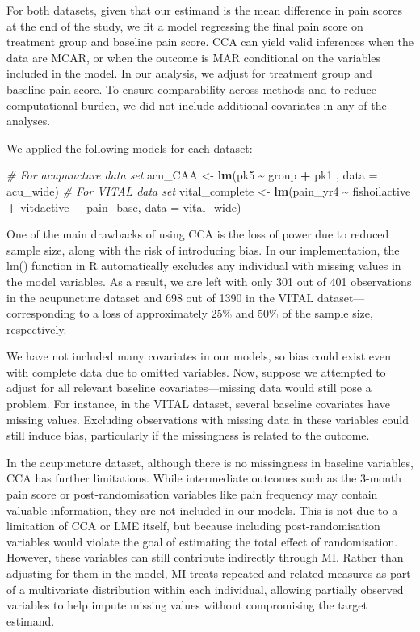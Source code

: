 \documentclass{article}
\newenvironment{Shaded}{\begin{snugshade}}{\end{snugshade}}
\newcommand{\AttributeTok}[1]{\textcolor[rgb]{0.13,0.29,0.53}{#1}}
\newcommand{\CommentTok}[1]{\textcolor[rgb]{0.56,0.35,0.01}{\textit{#1}}}
\newcommand{\FunctionTok}[1]{\textcolor[rgb]{0.13,0.29,0.53}{\textbf{#1}}}
\newcommand{\NormalTok}[1]{#1}
\newcommand{\OtherTok}[1]{\textcolor[rgb]{0.56,0.35,0.01}{#1}}
\newcommand{\SpecialCharTok}[1]{\textcolor[rgb]{0.81,0.36,0.00}{\textbf{#1}}}
\begin{document}
For both datasets, given that our estimand is the mean difference in
pain scores at the end of the study, we fit a model regressing the final
pain score on treatment group and baseline pain score. CCA can yield
valid inferences when the data are MCAR, or when the outcome is MAR
conditional on the variables included in the model. In our analysis, we
adjust for treatment group and baseline pain score. To ensure
comparability across methods and to reduce computational burden, we did
not include additional covariates in any of the analyses.

We applied the following models for each dataset:

\begin{Shaded}
\begin{Highlighting}[]
\CommentTok{\# For acupuncture data set}
\NormalTok{acu\_CAA }\OtherTok{\textless{}{-}} \FunctionTok{lm}\NormalTok{(pk5 }\SpecialCharTok{\textasciitilde{}}\NormalTok{ group }\SpecialCharTok{+}\NormalTok{ pk1 , }\AttributeTok{data =}\NormalTok{ acu\_wide)}
\CommentTok{\# For VITAL data set}
\NormalTok{vital\_complete }\OtherTok{\textless{}{-}} \FunctionTok{lm}\NormalTok{(pain\_yr4 }\SpecialCharTok{\textasciitilde{}}\NormalTok{ fishoilactive }\SpecialCharTok{+}\NormalTok{ vitdactive }\SpecialCharTok{+}\NormalTok{ pain\_base, }\AttributeTok{data =}\NormalTok{ vital\_wide)}
\end{Highlighting}
\end{Shaded}

One of the main drawbacks of using CCA is the loss of power due to
reduced sample size, along with the risk of introducing bias. In our
implementation, the lm() function in R automatically excludes any
individual with missing values in the model variables. As a result, we
are left with only 301 out of 401 observations in the acupuncture
dataset and 698 out of 1390 in the VITAL dataset---corresponding to a
loss of approximately 25\% and 50\% of the sample size, respectively.

We have not included many covariates in our models, so bias could exist
even with complete data due to omitted variables. Now, suppose we
attempted to adjust for all relevant baseline covariates---missing data
would still pose a problem. For instance, in the VITAL dataset, several
baseline covariates have missing values. Excluding observations with
missing data in these variables could still induce bias, particularly if
the missingness is related to the outcome.

In the acupuncture dataset, although there is no missingness in baseline
variables, CCA has further limitations. While intermediate outcomes such
as the 3-month pain score or post-randomisation variables like pain
frequency may contain valuable information, they are not included in our
models. This is not due to a limitation of CCA or LME itself, but
because including post-randomisation variables would violate the goal of
estimating the total effect of randomisation. However, these variables
can still contribute indirectly through MI. Rather than adjusting for
them in the model, MI treats repeated and related measures as part of a
multivariate distribution within each individual, allowing partially
observed variables to help impute missing values without compromising
the target estimand.
\end{document}
